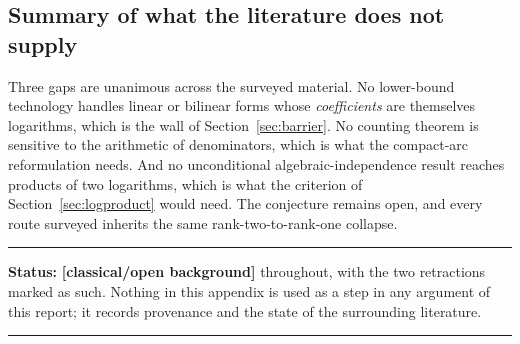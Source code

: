 \documentclass[11pt,oneside]{article}
\theoremstyle{definition}
\theoremstyle{remark}
\newcommand{\statusknown}{\textcolor{classicalgray}{\textbf{[classical/\allowbreak open background]}}}
\newenvironment{statusbox}[1]
{\begin{center}\begin{minipage}{0.94\textwidth}\raggedright\hbadness=10000\hrule
\vspace{0.45em}\textbf{Status:} #1\par\vspace{0.35em}}
{\vspace{0.35em}\hrule\end{minipage}\end{center}}
\begin{document}
\subsection{Summary of what the literature does not supply}

Three gaps are unanimous across the surveyed material.  No lower-bound technology handles
linear or bilinear forms whose \emph{coefficients} are themselves logarithms, which is the wall
of Section~\ref{sec:barrier}.  No counting theorem is sensitive to the arithmetic of
denominators, which is what the compact-arc reformulation needs.  And no unconditional
algebraic-independence result reaches products of two logarithms, which is what the criterion
of Section~\ref{sec:logproduct} would need.  The conjecture remains open, and every route
surveyed inherits the same rank-two-to-rank-one collapse.

\begin{statusbox}{\statusknown{} throughout, with the two retractions marked as such.  Nothing
in this appendix is used as a step in any argument of this report; it records provenance and
the state of the surrounding literature.}
\end{statusbox}
\end{document}
